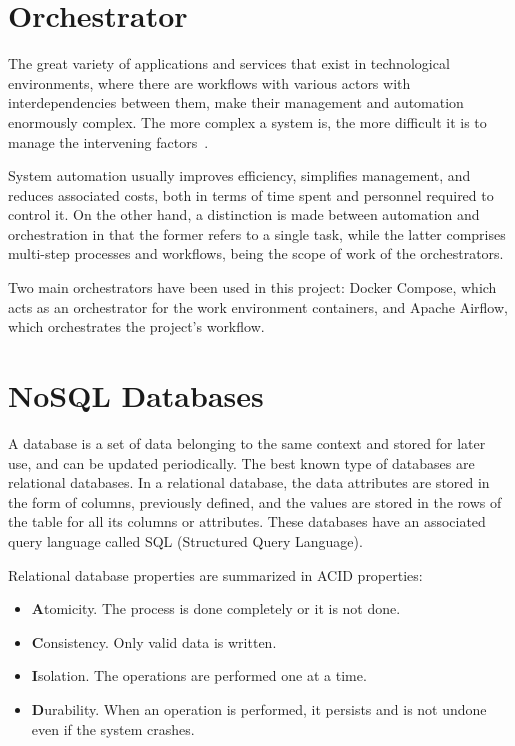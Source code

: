 \section{Orchestrator}

\nonzeroparskip The great variety of applications and services that exist in technological environments, where there are workflows with various actors with interdependencies between them, make their management and automation enormously complex. The more complex a system is, the more difficult it is to manage the intervening factors~\cite{redhat_orchestrator}.

\nonzeroparskip System automation usually improves efficiency, simplifies management, and reduces associated costs, both in terms of time spent and personnel required to control it. On the other hand, a distinction is made between automation and orchestration in that the former refers to a single task, while the latter comprises multi-step processes and workflows, being the scope of work of the orchestrators.

\nonzeroparskip Two main orchestrators have been used in this project: Docker Compose, which acts as an orchestrator for the work environment containers, and Apache Airflow, which orchestrates the project's workflow.

\section{NoSQL Databases}

\nonzeroparskip A database is a set of data belonging to the same context and stored for later use, and can be updated periodically. The best known type of databases are relational databases. In a relational database, the data attributes are stored in the form of columns, previously defined, and the values are stored in the rows of the table for all its columns or attributes. These databases have an associated query language called SQL (Structured Query Language).

\nonzeroparskip Relational database properties are summarized in ACID properties:
\begin{itemize}
	\item \textbf{A}tomicity. The process is done completely or it is not done.
	\item \textbf{C}onsistency. Only valid data is written.
	\item \textbf{I}solation. The operations are performed one at a time.
	\item \textbf{D}urability. When an operation is performed, it persists and is not undone even if the system crashes.
\end{itemize}

